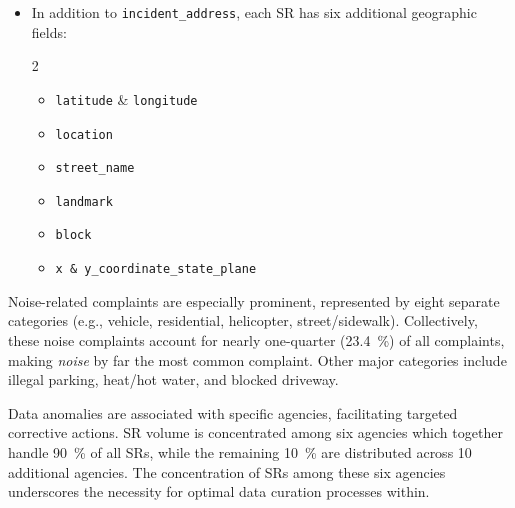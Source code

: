 \documentclass[linenumber]{jdsart}
\begin{document}
\begin{itemize}[left=1.5em, itemsep=0.25\baselineskip]
\begin{multicols}{2}
\begin{itemize}[label=\textbullet, itemsep=1.25pt]
    \item \texttt{landmark}
    \item \texttt{street\_name}
    \item \texttt{incident\_address}
\end{itemize}
\end{multicols}


\item In addition to \texttt{incident\_address}, each SR has six
	additional geographic fields:

\begin{multicols}{2}
\begin{itemize}[label=\textbullet]
    \item \texttt{latitude} \& \texttt{longitude}
    \item \texttt{location}
    \item \texttt{street\_name}
    \item \texttt{landmark}
    \item \texttt{block}
    \item \texttt{x \& y\_coordinate\_state\_plane}
\end{itemize}
\end{multicols}

\end{itemize}

Noise-related complaints are especially prominent, represented by eight separate
categories (e.g., vehicle, residential, helicopter, street/sidewalk). 
Collectively, these noise complaints account for nearly one-quarter (\SI{23.4}{\percent})
of all complaints, making \textit{noise} by far the most common complaint.
Other major categories include illegal parking, heat/hot water, and blocked
driveway. 


Data anomalies are associated with specific agencies, facilitating targeted 
corrective actions. SR volume is concentrated among six agencies which together 
handle \SI{90}{\percent} of all SRs, while the remaining \SI{10}{\percent} are 
distributed across \num{10} additional agencies. The concentration of SRs among 
these six agencies underscores the necessity for optimal data curation processes within. 
\end{document}
